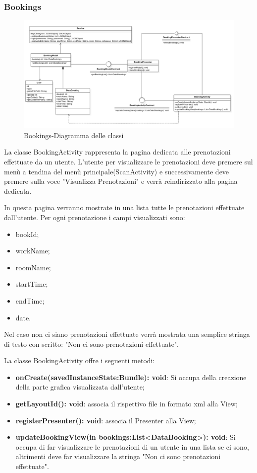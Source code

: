 \subsubsection{Bookings}
\begin{figure}[H]
	\centering
	\includegraphics[width=16cm]{res/images/BookingsClass.png}
	\caption{Bookings-Diagramma delle classi}
	\label{fig:Bookings-Diagramma delle classi}
\end{figure}
La classe BookingActivity rappresenta la pagina dedicata alle prenotazioni effettuate da un utente. L'utente per visualizzare le prenotazioni deve premere sul menù a tendina del menù principale(ScanActivity) e successivamente deve premere sulla voce "Visualizza Prenotazioni" e verrà reindirizzato alla pagina dedicata.

In questa pagina verranno mostrate in una lista tutte le prenotazioni effettuate dall'utente. Per ogni prenotazione i campi visualizzati sono: 
\begin{itemize}
	\item bookId; 
	\item workName; 
	\item roomName; 
	\item startTime; 
	\item endTime; 
	\item date. 
\end{itemize}
Nel caso non ci siano prenotazioni effettuate verrà mostrata una semplice stringa di testo con scritto: "Non ci sono prenotazioni effettuate".

La classe BookingActivity offre i seguenti metodi:
\begin{itemize}
	\item \textbf{onCreate(savedInstanceState:Bundle): void}: Si occupa della creazione della parte grafica visualizzata dall'utente; 
	\item \textbf{getLayoutId(): void}: associa il rispettivo file in formato xml alla View;
	\item \textbf{registerPresenter(): void}: associa il Presenter alla View;
	\item \textbf{updateBookingView(in bookings:List<DataBooking>): void}: Si occupa di far visualizzare le prenotazioni di un utente in una lista se ci sono, altrimenti deve far visualizzare la stringa "Non ci sono prenotazioni effettuate".
\end{itemize}


